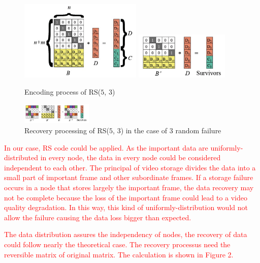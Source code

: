 \documentclass[sigconf]{acmart}
\begin{document}
\begin{figure}[ht]
\centering
\begin{minipage}[b]{0.3\textwidth}
\includegraphics[width=0.52\textwidth]{photo/RS1.jpg}
\includegraphics[width=0.4\textwidth]{photo/RS2.jpg}
\end{minipage}
\caption{Encoding process of RS($5$, $3$)}
\end{figure}

\begin{figure}[H]
\centering
\includegraphics[width=0.3\textwidth]{photo/RS3.jpg}
\caption{Recovery processing of RS($5$, $3$) in the case of 3 random failure}
\end{figure}

\textcolor{red}{In our case, RS code could be applied. As the important data are uniformly-distributed in every node, the data in every node could be considered independent to each other. The principal of video storage divides the data into a small part of important frame and other subordinate frames. If a storage failure occurs in a node that stores largely the important frame, the data recovery may not be complete because the loss of the important frame could lead to a video quality degradation. In this way, this kind of uniformly-distribution would not allow the failure causing the data loss bigger than expected.}

\textcolor{red}{The data distribution assures the independency of nodes, the recovery of data could follow nearly the theoretical case. The recovery processus need the reversible matrix of original matrix. The calculation is shown in Figure 2.}
\end{document}
